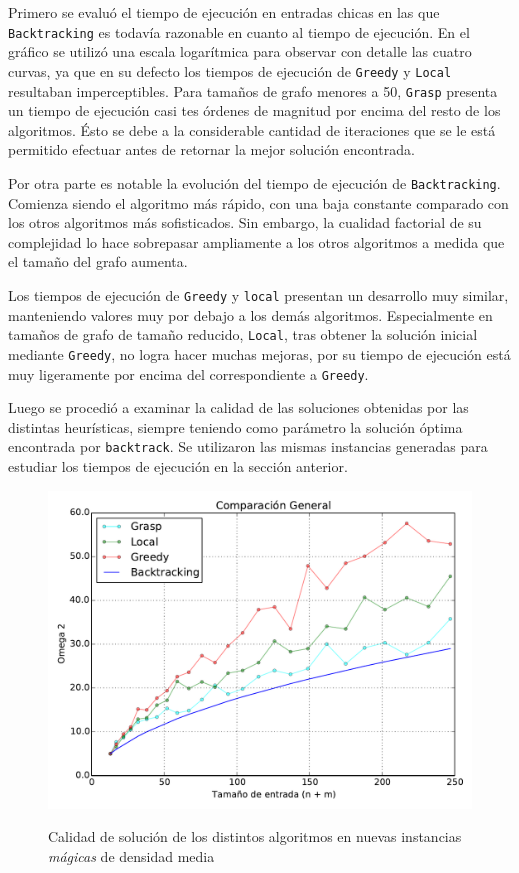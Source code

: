 Primero se evaluó el tiempo de ejecución en entradas chicas en las que \texttt{Backtracking} es todavía razonable en cuanto al tiempo de ejecución. En el gráfico se utilizó una escala logarítmica para observar con detalle las cuatro curvas, ya que en su defecto los tiempos de ejecución de \texttt{Greedy} y \texttt{Local} resultaban imperceptibles. Para tamaños de grafo menores a 50, \texttt{Grasp} presenta un tiempo de ejecución casi tes órdenes de magnitud por encima del resto de los algoritmos. Ésto se debe a la considerable cantidad de iteraciones que se le está permitido efectuar antes de retornar la mejor solución encontrada.

Por otra parte es notable la evolución del tiempo de ejecución de \texttt{Backtracking}. Comienza siendo el algoritmo más rápido, con una baja constante comparado con los otros algoritmos más sofisticados. Sin embargo, la cualidad factorial de su complejidad lo hace sobrepasar ampliamente a los otros algoritmos a medida que el tamaño del grafo aumenta.

Los tiempos de ejecución de \texttt{Greedy} y \texttt{local} presentan un desarrollo muy similar, manteniendo valores muy por debajo a los demás algoritmos. Especialmente en tamaños de grafo de tamaño reducido, \texttt{Local}, tras obtener la solución inicial mediante \texttt{Greedy}, no logra hacer muchas mejoras, por su tiempo de ejecución está muy ligeramente por encima del correspondiente a \texttt{Greedy}.

Luego se procedió a examinar la calidad de las soluciones obtenidas por las distintas heurísticas, siempre teniendo como parámetro la solución óptima encontrada por \texttt{backtrack}. Se utilizaron las mismas instancias generadas para estudiar los tiempos de ejecución en la sección anterior.

\begin{figure}[H]
\begin{center}
\includegraphics[angle=0, scale=.75]{imagenes/todas-calidad.pdf}
\label{grafico local calidad}
\caption{Calidad de solución de los distintos algoritmos en nuevas instancias \textit{mágicas} de densidad media}
\end{center}
\end{figure}

